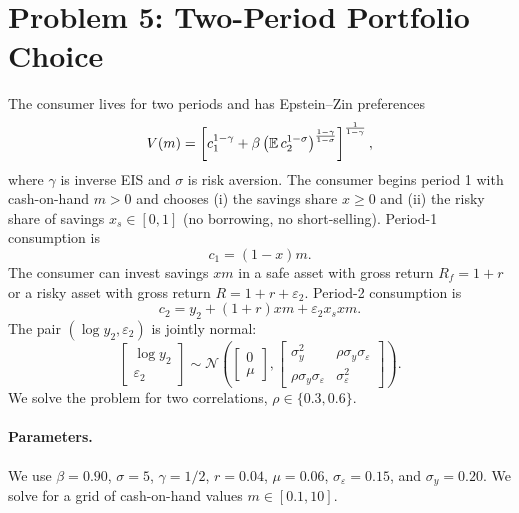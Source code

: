 \section{Problem 5: Two-Period Portfolio Choice}

The consumer lives for two periods and has Epstein--Zin preferences
\begin{equation}
  V(m) =
  \left[
    c_1^{1-\gamma}
    + \beta
    \left(\mathbb{E}\, c_2^{1-\sigma}\right)^{\frac{1-\gamma}{1-\sigma}}
  \right]^{\frac{1}{1-\gamma}},
  \label{eq:p5-ez}
\end{equation}
where $\gamma$ is inverse EIS and $\sigma$ is risk aversion. The consumer begins period 1 with cash-on-hand $m>0$ and chooses (i) the savings share $x \ge 0$ and (ii) the risky share of savings $x_s \in [0,1]$ (no borrowing, no short-selling). Period-1 consumption is
\begin{equation}
  c_1 = (1-x)m.
\end{equation}
The consumer can invest savings $xm$ in a safe asset with gross return $R_f = 1+r$ or a risky asset with gross return $R = 1+r+\varepsilon_2$. Period-2 consumption is
\begin{equation}
  c_2 = y_2 + (1+r)xm + \varepsilon_2 x_s xm.
  \label{eq:p5-c2}
\end{equation}
The pair $(\log y_2,\varepsilon_2)$ is jointly normal:
\begin{equation}
  \begin{bmatrix}\log y_2 \\ \varepsilon_2\end{bmatrix}
  \sim \mathcal{N}\left(
  \begin{bmatrix}0 \\ \mu\end{bmatrix},
  \begin{bmatrix}
    \sigma_y^2 & \rho \sigma_y \sigma_\varepsilon \\
    \rho \sigma_y \sigma_\varepsilon & \sigma_\varepsilon^2
  \end{bmatrix}
  \right).
\end{equation}
We solve the problem for two correlations, $\rho \in \{0.3,0.6\}$.

\paragraph{Parameters.}
We use $\beta = 0.90$, $\sigma = 5$, $\gamma = 1/2$, $r = 0.04$, $\mu = 0.06$, $\sigma_\varepsilon = 0.15$, and $\sigma_y = 0.20$. We solve for a grid of cash-on-hand values $m \in [0.1,10]$.

